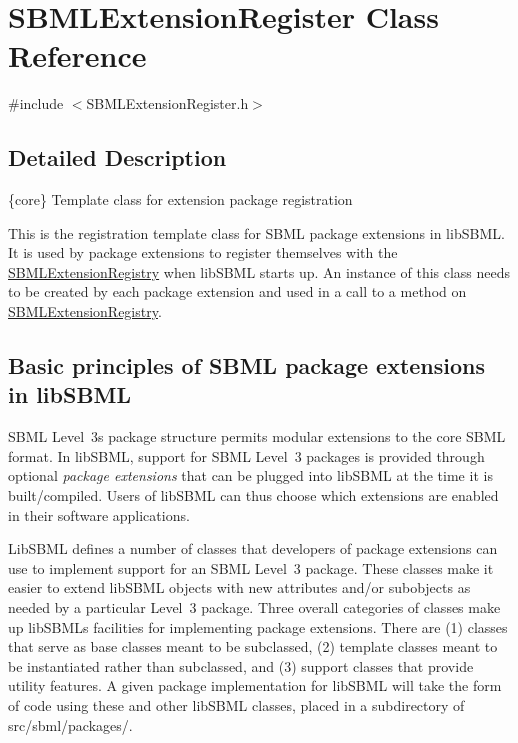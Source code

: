 \hypertarget{class_s_b_m_l_extension_register}{}\section{S\+B\+M\+L\+Extension\+Register Class Reference}
\label{class_s_b_m_l_extension_register}


{\ttfamily \#include $<$S\+B\+M\+L\+Extension\+Register.\+h$>$}



\subsection{Detailed Description}
\{core\} Template class for extension package registration



This is the registration template class for S\+B\+ML package extensions in lib\+S\+B\+ML. It is used by package extensions to register themselves with the \hyperlink{class_s_b_m_l_extension_registry}{S\+B\+M\+L\+Extension\+Registry} when lib\+S\+B\+ML starts up. An instance of this class needs to be created by each package extension and used in a call to a method on \hyperlink{class_s_b_m_l_extension_registry}{S\+B\+M\+L\+Extension\+Registry}.\hypertarget{classdoc__basics__of__extensions_ext-basics}{}\subsection{Basic principles of S\+B\+M\+L package extensions in lib\+S\+B\+ML}\label{classdoc__basics__of__extensions_ext-basics}
\begin{DoxyParagraph}{}
S\+B\+ML Level~3\textquotesingle{}s package structure permits modular extensions to the core S\+B\+ML format. In lib\+S\+B\+ML, support for S\+B\+ML Level~3 packages is provided through optional {\itshape package extensions} that can be plugged into lib\+S\+B\+ML at the time it is built/compiled. Users of lib\+S\+B\+ML can thus choose which extensions are enabled in their software applications.
\end{DoxyParagraph}
Lib\+S\+B\+ML defines a number of classes that developers of package extensions can use to implement support for an S\+B\+ML Level~3 package. These classes make it easier to extend lib\+S\+B\+ML objects with new attributes and/or subobjects as needed by a particular Level~3 package. Three overall categories of classes make up lib\+S\+B\+ML\textquotesingle{}s facilities for implementing package extensions. There are (1) classes that serve as base classes meant to be subclassed, (2) template classes meant to be instantiated rather than subclassed, and (3) support classes that provide utility features. A given package implementation for lib\+S\+B\+ML will take the form of code using these and other lib\+S\+B\+ML classes, placed in a subdirectory of {\ttfamily src/sbml/packages/}.


